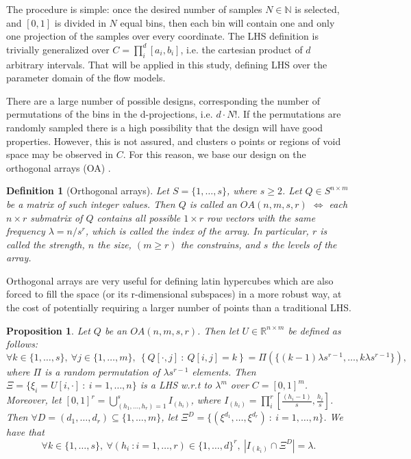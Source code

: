 \documentclass{article}
\newtheorem{definition}[theorem]{Definition}
\newtheorem{proposition}[theorem]{Proposition}
\begin{document}
The procedure is simple: once the desired number of samples $N\in\mathbb N$ is selected, and $[0,1]$ is divided in $N$ equal bins, then each bin will contain one and only one projection of the samples over every coordinate. The LHS definition is trivially generalized over $C=\prod^d_i [a_i, b_i]$, i.e. the cartesian product of $d$ arbitrary intervals. That will be applied in this study, defining LHS over the parameter domain of the flow models.

There are a large number of possible designs, corresponding the number of permutations of the bins in the d-projections, i.e. $d\cdot N!$. If the permutations are randomly sampled there is a high possibility that the design will have good properties. However, this is not assured, and clusters o points or regions of void space may be observed in $C$. For this reason, we base our design on the orthogonal arrays (OA) \citep{Owen1992,Tang1993}.

\begin{definition}[Orthogonal arrays]
Let $S=\{1,\dots,s\}$, where $s\ge 2$. Let $Q\in S^{n\times m}$ be a matrix of such integer values. Then $Q$ is called an $OA(n,m,s,r)$ $\Longleftrightarrow$ each $n\times r$ submatrix of $Q$ contains all possible $1\times r$ row vectors with the same frequency $\lambda=n/s^r$, which is called the index of the array. In particular, $r$ is called the strength, $n$ the size, $(m\ge r)$ the constrains, and $s$ the levels of the array.
\end{definition}

Orthogonal arrays are very useful for defining latin hypercubes which are also forced to fill the space (or its r-dimensional subspaces) in a more robust way, at the cost of potentially requiring a larger number of points than a traditional LHS.

\begin{proposition}
Let $Q$ be an $OA(n,m,s,r)$. Then let $U\in\mathbb R^{n\times m}$ be defined as follows:
$$\forall k\in \{1,\dots,s\},\ \forall j\in \{1,\dots,m\},\ \left\{Q[\cdot,j]\ :\ Q[i,j]=k\right\} = \Pi\left(\{(k-1)\lambda s^{r-1},\dots, k\lambda s^{r-1}\}\right),$$
where $\Pi$ is a random permutation of $\lambda s^{r-1}$ elements. Then $\Xi=\{\xi_i=U[i,\cdot]\ :\ i=1,\dots,n\}$ is a LHS w.r.t to $\lambda^m$ over $C=[0,1]^m$. Moreover, let $[0,1]^r=\bigcup_{(h_1,\dots,h_r)=1}^{s} I_{(h_i)}$, where $I_{(h_i)}=\prod^r_i[\frac{(h_i-1)}{s},\frac{h_i}{s}]$. Then $\forall D=(d_1,\dots,d_r)\subseteq \{1,\dots,m\}$, let $\Xi^D=\{(\xi^{d_1},\dots,\xi^{d_r})\ :\ i=1,\dots,n\}$. We have that
$$\forall k\in \{1,\dots,s\},\ \forall (h_i\ : i=1,\dots,r)\in\{1,\dots,d\}^r,\ \left|I_{(k_i)}\cap\Xi^D\right|=\lambda.$$
\end{proposition}
\end{document}

